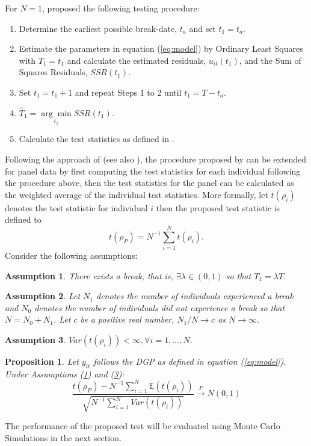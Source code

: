 \documentclass[a4paper,fleqn]{article} %
\newcommand{\E}{\mathbb{E}}
\newtheorem{assumption}{Assumption}
\newtheorem{proposition}{Proposition}
\begin{document}
\noindent For $N=1$, \citet{KimPerron:2009} proposed the following testing procedure:
\begin{enumerate}[Step 1.]
	\item Determine the earliest possible break-date, $t_a$ and set $t_1=t_a$.
	\item Estimate the parameters in equation (\ref{eq:model}) by Ordinary Least Squares with $T_1=t_1$ and calculate the estimated residuals, $u_{it}(t_1)$, and the Sum of Squares Residuals, $SSR(t_1)$.
	\item Set $t_1=t_1+1$ and repeat Steps 1 to 2 until $t_1 = T-t_a$.
	\item $\hat{T}_1 = \underset{t_1}{\arg \min} SSR(t_1)$.
	\item Calculate the test statistics as defined in \citet{Perron:1997}.
\end{enumerate}
\noindent Following the approach of \citet{ChanManciniPauwels:2009} (see also \citet{Im:2003}), the procedure proposed by \citet{KimPerron:2009} can be extended for panel data by first computing the test statistics for each individual following the procedure above, then the test statistics for the panel can be calculated as the weighted average of the individual test statistics. More formally, let $t(\rho _i)$ denotes the test statistic for individual $i$ then the proposed test statistic is defined to
\begin{equation}
	t(\rho _P) = N^{-1} \sum ^N_{i=1} t(\rho _i). \label{eq:test_statistics}
\end{equation}
\noindent Consider the following assumptions:
\begin{assumption}
	There exists a break, that is, $\exists \lambda \in (0,1)$ so that $T_1 = \lambda T$. \label{ass:break}
\end{assumption}
\begin{assumption}
	Let $N_1$ denotes the number of individuals experienced a break and $N_0$ denotes the number of individuals did not experience a break so that $N=N_0+N_1$. Let $c$ be a positive real number, $N_1/N \rightarrow c$ as $N\rightarrow \infty$.
\end{assumption}
\begin{assumption}
	$Var(t(\rho _i)) < \infty, \forall i=1,\ldots,N$. \label{ass:variance}
\end{assumption}

\begin{proposition}
	Let $y_{it}$ follows the DGP as defined in equation (\ref{eq:model}). Under Assumptions (\ref{ass:break}) and (\ref{ass:variance}):
	\begin{equation}
		\frac{t(\rho _P)-N^{-1}\sum^N_{i=1} \E \left ( t(\rho_i) \right )}{\sqrt{N^{-1}\sum ^N_{i=1}Var(t(\rho _i))}} \overset{P}{\longrightarrow} N(0,1)
	\end{equation}
\end{proposition}
\noindent The performance of the proposed test will be evaluated using Monte Carlo Simulations in the next section.
\end{document}
